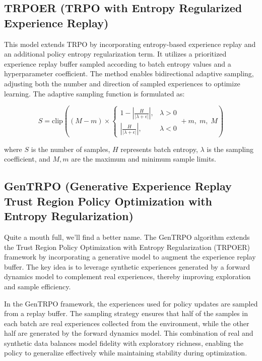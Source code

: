\documentclass{article}
\begin{document}
\subsection{TRPOER (TRPO with Entropy Regularized Experience Replay)}

This model extends TRPO by incorporating entropy-based experience replay and an additional policy entropy regularization term. It utilizes a prioritized experience replay buffer sampled according to batch entropy values and a hyperparameter coefficient. The method enables bidirectional adaptive sampling, adjusting both the number and direction of sampled experiences to optimize learning. The adaptive sampling function is formulated as:

\begin{equation}
    S = \text{clip} \left( \left( M - m \right) \times 
    \begin{cases}
        1 - \left| \frac{H}{| \lambda + \epsilon |} \right|, & \lambda > 0 \\
        \left| \frac{H}{| \lambda + \epsilon |} \right|, & \lambda < 0
    \end{cases}
    + m, \; m, \; M \right)
\end{equation}

where \( S \) is the number of samples, \( H \) represents batch entropy, \( \lambda \) is the sampling coefficient, and \( M, m \) are the maximum and minimum sample limits.


\subsection{GenTRPO (Generative Experience Replay Trust Region Policy Optimization with Entropy Regularization)}

Quite a mouth full, we'll find a better name. The GenTRPO algorithm extends the Trust Region Policy Optimization with Entropy Regularization (TRPOER) framework \cite{schulman2017proximalpolicyoptimizationalgorithms,schulman2017trustregionpolicyoptimization} by incorporating a generative model to augment the experience replay buffer. The key idea is to leverage synthetic experiences generated by a forward dynamics model to complement real experiences, thereby improving exploration and sample efficiency. 

In the GenTRPO framework, the experiences used for policy updates are sampled from a replay buffer. The sampling strategy ensures that half of the samples in each batch are real experiences collected from the environment, while the other half are generated by the forward dynamics model. This combination of real and synthetic data balances model fidelity with exploratory richness, enabling the policy to generalize effectively while maintaining stability during optimization.
\end{document}
